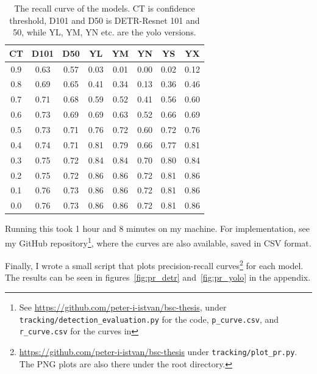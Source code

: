 \begin{table}
    \begin{centering}
    \begin{tabular}{|c||c|c|c|c|c|c|c|}
        \hline
        CT & D101 & D50 & YL & YM & YN & YS & YX \\
        \hline
        \hline
        0.9 & 0.63 & 0.57 & 0.03 & 0.01 & 0.00 & 0.02 & 0.12 \\
        \hline 
        0.8 & 0.69 & 0.65 & 0.41 & 0.34 & 0.13 & 0.36 & 0.46 \\
        \hline 
        0.7 & 0.71 & 0.68 & 0.59 & 0.52 & 0.41 & 0.56 & 0.60 \\
        \hline 
        0.6 & 0.73 & 0.69 & 0.69 & 0.63 & 0.52 & 0.66 & 0.69 \\
        \hline 
        0.5 & 0.73 & 0.71 & 0.76 & 0.72 & 0.60 & 0.72 & 0.76 \\
        \hline 
        0.4 & 0.74 & 0.71 & 0.81 & 0.79 & 0.66 & 0.77 & 0.81 \\
        \hline 
        0.3 & 0.75 & 0.72 & 0.84 & 0.84 & 0.70 & 0.80 & 0.84 \\
        \hline 
        0.2 & 0.75 & 0.72 & 0.86 & 0.86 & 0.72 & 0.81 & 0.86 \\
        \hline 
        0.1 & 0.76 & 0.73 & 0.86 & 0.86 & 0.72 & 0.81 & 0.86 \\
        \hline 
        0.0 & 0.76 & 0.73 & 0.86 & 0.86 & 0.72 & 0.81 & 0.86 \\
        \hline
    \end{tabular}
    \caption{The recall curve of the models. CT is confidence threshold, D101 and D50 is DETR-Resnet 101 and 50, while YL, YM, YN etc. are the yolo versions.}
    \label{tab:r_curve}
    \end{centering}
\end{table}

Running this took 1 hour and 8 minutes on my machine. For implementation, see my GitHub repository\footnote{See \url{https://github.com/peter-i-istvan/bsc-thesis}, under \texttt{tracking/detection\_evaluation.py} for the code, \texttt{p\_curve.csv}, and \texttt{r\_curve.csv} for the curves in }, where the curves are also available, saved in CSV format.

Finally, I wrote a small script that plots precision-recall curves\footnote{\url{https://github.com/peter-i-istvan/bsc-thesis} under \texttt{tracking/plot\_pr.py}. The PNG plots are also there under the root directory.} for each model. The results can be seen in figures~\ref{fig:pr_detr} and~\ref{fig:pr_yolo} in the appendix.

